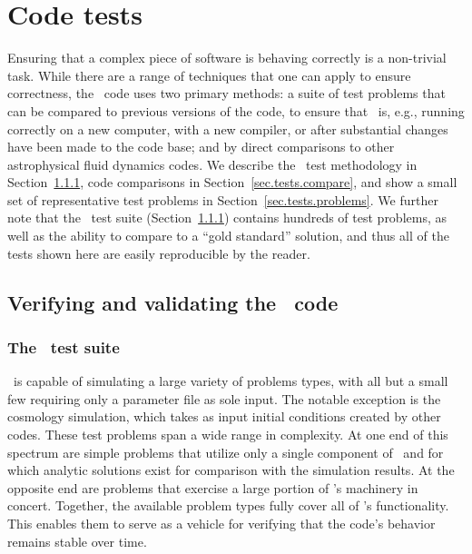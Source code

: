 
\section{Code tests}
\label{sec.tests}

Ensuring that a complex piece of software is behaving correctly is a
non-trivial task.  While there are a range of techniques that one can
apply to ensure correctness, the \enzo\ code uses two primary methods:
a suite of test problems that can be compared to previous versions of
the code, to ensure that \enzo\ is, e.g., running correctly on a new
computer, with a new compiler, or after substantial changes have been
made to the code base; and by direct comparisons to other
astrophysical fluid dynamics codes.  We describe the \enzo\ test
methodology in Section~\ref{sec.tests.suite}, code comparisons in
Section~\ref{sec.tests.compare}, and show a small set of
representative test problems in Section~\ref{sec.tests.problems}.  We
further note that the \enzo\ test suite
(Section~\ref{sec.tests.suite}) contains hundreds of test problems, as
well as the ability to compare to a ``gold standard'' solution, and
thus all of the tests shown here are easily reproducible by the
reader.

\subsection{Verifying and validating the \enzo\ code}
\label{sec.tests.vandv}

\subsubsection{The \enzo\ test suite}
\label{sec.tests.suite}

\enzo\ is capable of simulating a large variety of problems types, with
all but a small few requiring only a parameter file as sole input.
The notable exception is the cosmology simulation, which takes as
input initial conditions created by other codes.  These test problems
span a wide range in complexity.  At one end of this spectrum are
simple problems that utilize only a single component of \enzo\ and for
which analytic solutions exist for comparison with the simulation
results.  At the opposite end are problems that exercise a large
portion of \enzo's machinery in concert.  Together, the available
problem types fully cover all of \enzo's functionality.  This enables
them to serve as a vehicle for verifying that the code's behavior
remains stable over time.

